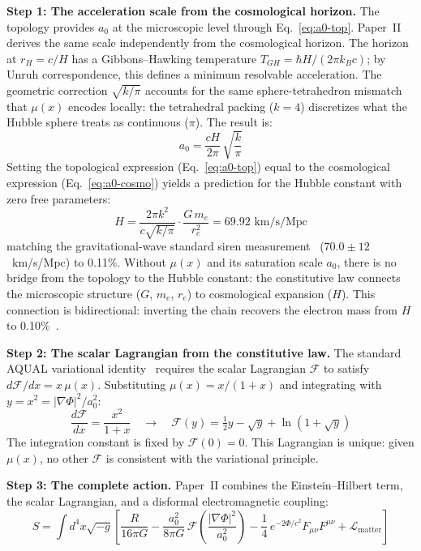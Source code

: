 \documentclass[11pt]{article}
\begin{document}
\textbf{Step 1: The acceleration scale from the cosmological horizon.}\quad
The topology provides $a_0$ at the microscopic level through Eq.~\ref{eq:a0-top}. Paper~II derives the same scale independently from the cosmological horizon. The horizon at $r_H = c/H$ has a Gibbons--Hawking temperature $T_{GH} = \hbar H/(2\pi k_B c)$; by Unruh correspondence, this defines a minimum resolvable acceleration. The geometric correction $\sqrt{k/\pi}$ accounts for the same sphere-tetrahedron mismatch that $\mu(x)$ encodes locally: the tetrahedral packing ($k = 4$) discretizes what the Hubble sphere treats as continuous ($\pi$). The result is:
\begin{equation}
a_0 = \frac{cH}{2\pi}\,\sqrt{\frac{k}{\pi}}
\label{eq:a0-cosmo}
\end{equation}
Setting the topological expression (Eq.~\ref{eq:a0-top}) equal to the cosmological expression (Eq.~\ref{eq:a0-cosmo}) yields a prediction for the Hubble constant with zero free parameters:
\begin{equation}
H = \frac{2\pi k^2}{c\sqrt{k/\pi}} \cdot \frac{G\,m_e}{r_e^2} = 69.92 \text{ km/s/Mpc}
\label{eq:H}
\end{equation}
matching the gravitational-wave standard siren measurement~\cite{gw170817} ($70.0 \pm 12$~km/s/Mpc) to 0.11\%. Without $\mu(x)$ and its saturation scale $a_0$, there is no bridge from the topology to the Hubble constant: the constitutive law connects the microscopic structure ($G$, $m_e$, $r_e$) to cosmological expansion ($H$). This connection is bidirectional: inverting the chain recovers the electron mass from $H$ to 0.10\%~\cite{nelson2026main}.

\textbf{Step 2: The scalar Lagrangian from the constitutive law.}\quad
The standard AQUAL variational identity~\cite{bekenstein1984} requires the scalar Lagrangian $\mathcal{F}$ to satisfy $d\mathcal{F}/dx = x\,\mu(x)$. Substituting $\mu(x) = x/(1+x)$ and integrating with $y = x^2 = |\nabla\Phi|^2/a_0^2$:
\begin{equation}
\frac{d\mathcal{F}}{dx} = \frac{x^2}{1+x} \quad\longrightarrow\quad \mathcal{F}(y) = \tfrac{1}{2}y - \sqrt{y} + \ln(1 + \sqrt{y})
\label{eq:lagrangian}
\end{equation}
The integration constant is fixed by $\mathcal{F}(0) = 0$. This Lagrangian is unique: given $\mu(x)$, no other $\mathcal{F}$ is consistent with the variational principle.

\textbf{Step 3: The complete action.}\quad
Paper~II combines the Einstein--Hilbert term, the scalar Lagrangian, and a disformal electromagnetic coupling:
\begin{equation}
\boxed{S = \int d^4x \sqrt{-g} \left[ \frac{R}{16\pi G} - \frac{a_0^2}{8\pi G}\,\mathcal{F}\!\left(\frac{|\nabla\Phi|^2}{a_0^2}\right) - \frac{1}{4}\,e^{-2\Phi/c^2} F_{\mu\nu}F^{\mu\nu} + \mathcal{L}_{\text{matter}} \right]}
\label{eq:action}
\end{equation}
\end{document}
